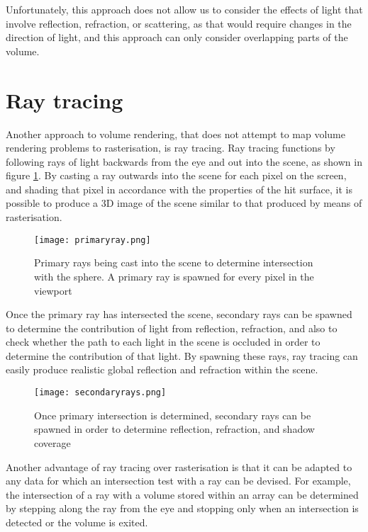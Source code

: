 Unfortunately, this approach does not allow us to consider the effects of light that involve reflection, refraction, or scattering, as that would require changes in the direction of light, and this approach can only consider overlapping parts of the volume.

\section{Ray tracing}
Another approach to volume rendering, that does not attempt to map volume rendering problems to rasterisation, is ray tracing. Ray tracing functions by following rays of light backwards from the eye and out into the scene, as shown in figure \ref{fig:ray_casting}. By casting a ray outwards into the scene for each pixel on the screen, and shading that pixel in accordance with the properties of the hit surface, it is possible to produce a 3D image of the scene similar to that produced by means of rasterisation.

\begin{figure}
\centering
	\texttt{[image: primaryray.png]}
	\caption{Primary rays being cast into the scene to determine intersection with the sphere. A primary ray is spawned for every pixel in the viewport}
	\label{fig:ray_casting}
\end{figure}

Once the primary ray has intersected the scene, secondary rays can be spawned to determine the contribution of light from reflection, refraction, and also to check whether the path to each light in the scene is occluded in order to determine the contribution of that light. By spawning these rays, ray tracing can easily produce realistic global reflection and refraction within the scene.

\begin{figure}
\centering
	\texttt{[image: secondaryrays.png]}
	\caption{Once primary intersection is determined, secondary rays can be spawned in order to determine reflection, refraction, and shadow coverage}
	\label{fig:ray_tracing}
\end{figure}

Another advantage of ray tracing over rasterisation is that it can be adapted to any data for which an intersection test with a ray can be devised. For example, the intersection of a ray with a volume stored within an array can be determined by stepping along the ray from the eye and stopping only when an intersection is detected or the volume is exited.

